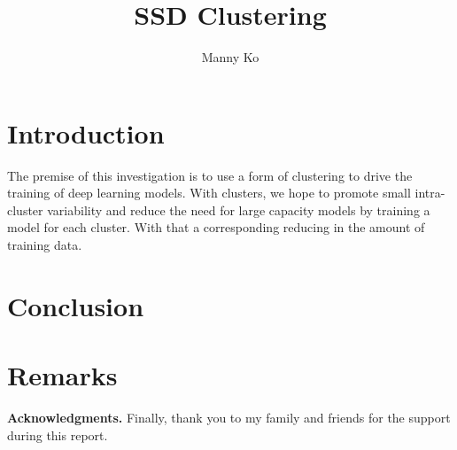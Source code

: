 \documentclass[oneside]{article}
\begin{document}
\title{SSD Clustering}
\author{Manny Ko  
}
\maketitle

\begin{abstract}



\end{abstract}




\section{Introduction}
\label{intro}
The premise of this investigation is to use a form of clustering to drive
the training of deep learning models. With clusters, we hope to promote
small intra-cluster variability and reduce the need for large capacity models
by training a model for each cluster.
With that a corresponding reducing in the amount of training data.

%
%


%
%

                                                                                             
%
%
%


\section{Conclusion}

\section{Remarks}


\vspace{24pt} \noindent\textbf{Acknowledgments.}{\small \quad
Finally, thank you to my family and friends for the support during this report.
}




\small{}




\end{document}
